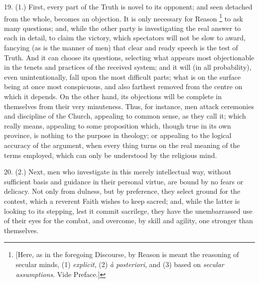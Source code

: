 19. (1.) First, every part of the Truth is novel to its opponent;
and seen detached from the whole, becomes an objection. It is only
necessary for Reason \footnote{[Here, as in the foregoing Discourse, by Reason is meant the
reasoning of secular minds, (1) \emph{explicit}, (2) \emph{à posteriori},
and (3) based on \emph{secular assumptions}. Vide Preface.]} to
ask many questions; and, while the other party is investigating the
real answer to each in detail, to claim the victory, which spectators
will not be slow to award, fancying (as is the manner of men) that
clear and ready speech is the test of Truth. And it can choose its
questions, selecting what appears most objectionable in the tenets and
practices of the received system; and it will (in all probability),
even unintentionally, fall upon the most difficult parts; what is on
the surface being at once most conspicuous, and also farthest removed
from the centre on which it depends. On the other hand, its objections
will be complete in themselves from their very minuteness. Thus, for
instance, men attack ceremonies and discipline of the Church,
appealing to common sense, as they call it; which really means,
appealing to some proposition which, though true in its own province,
is nothing to the purpose in theology; or appealing to the logical
accuracy of the argument, when every thing turns on the real meaning
of the terms employed, which can only be understood by the religious
mind.

20. (2.) Next, men who investigate in this merely intellectual way,
without sufficient basis and guidance in their personal virtue, are
bound by no fears or delicacy. Not only from dulness, but by
preference, they select ground for the contest, which a reverent Faith
wishes to keep sacred; and, while the latter is looking to its
stepping, lest it commit sacrilege, they have the unembarrassed use of
their eyes for the combat, and overcome, by skill and agility, one
stronger than themselves.

